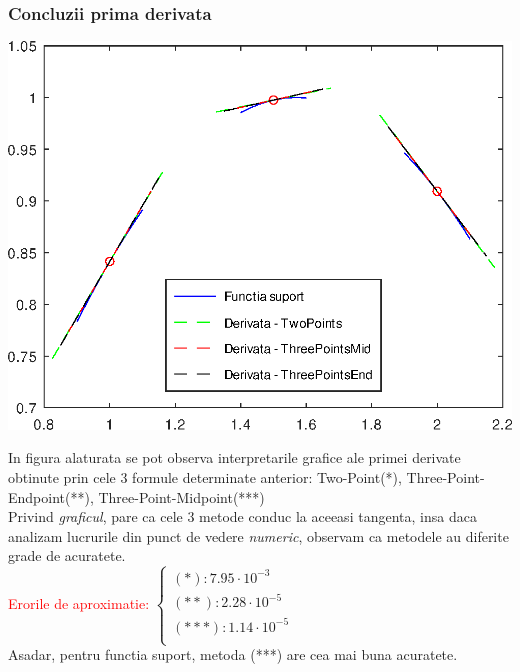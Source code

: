 \documentclass{article}
\begin{document}
\subsubsection{Concluzii prima derivata}
\hspace{-1.25cm}\begin{minipage}{0.625\textwidth}
    \includegraphics[scale=0.65]{comparatii_derivate}
\end{minipage}\hspace{-0.5cm}
\begin{minipage}{0.6\textwidth}
    \tabto{0.5cm} In figura alaturata se pot observa interpretarile grafice ale primei derivate obtinute prin cele $3$ formule determinate anterior: Two-Point(*), Three-Point-Endpoint(**), Three-Point-Midpoint(***)\\
    
    \tabto{0.5cm} Privind \textit{graficul}, pare ca cele $3$ metode conduc la aceeasi tangenta, insa daca analizam lucrurile din punct de vedere \textit{numeric}, observam ca metodele au diferite grade de acuratete. \\
    
    \vspace{0.25cm}\tabto{0.5cm} \textcolor{red}{Erorile de aproximatie:} $\begin{cases}
        (*): 7.95 \cdot 10^{-3} \\
        (**): 2.28 \cdot 10^{-5} \\
        (***): 1.14 \cdot 10^{-5} \\ 
    \end{cases}$ \\
    
    \tabto{0.5cm} Asadar, pentru functia suport, metoda (***) are cea mai buna acuratete. 
\end{minipage}\\
\end{document}
